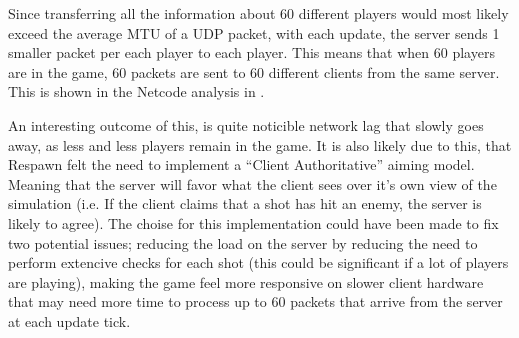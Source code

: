 Since transferring all the information about 60 different players would most likely exceed the average MTU of a UDP packet, with each update, the server sends 1 smaller packet per each player to each player. This means that when 60 players are in the game, 60 packets are sent to 60 different clients from the same server. This is shown in the Netcode analysis in .

An interesting outcome of this, is quite noticible network lag that slowly goes away, as less and less players remain in the game. It is also likely due to this, that Respawn felt the need to implement a ``Client Authoritative'' aiming model. Meaning that the server will favor what the client sees over it's own view of the simulation (i.e. If the client claims that a shot has hit an enemy, the server is likely to agree). The choise for this implementation could have been made to fix two potential issues; reducing the load on the server by reducing the need to perform extencive checks for each shot (this could be significant if a lot of players are playing), making the game feel more responsive on slower client hardware that may need more time to process up to 60 packets that arrive from the server at each update tick.

